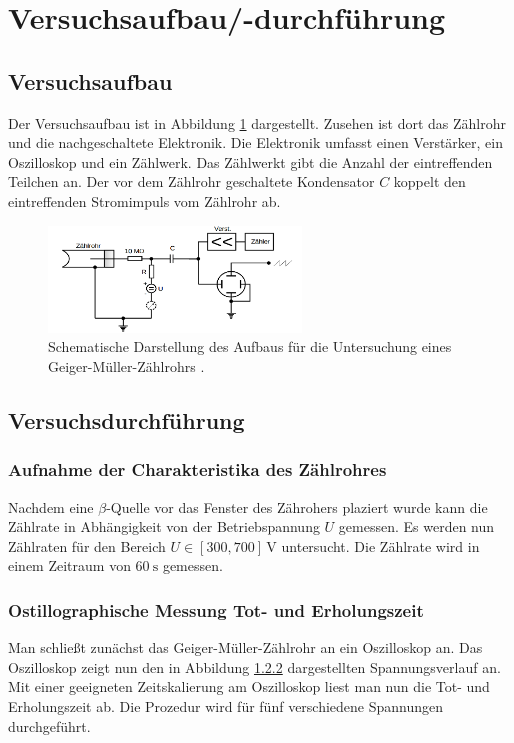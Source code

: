 \section{Versuchsaufbau/-durchführung}

\subsection{Versuchsaufbau}

Der Versuchsaufbau ist in Abbildung \ref{fig: versuchsaufabu} dargestellt.
Zusehen ist dort das Zählrohr und die nachgeschaltete Elektronik.
Die Elektronik umfasst einen Verstärker, ein Oszilloskop und
ein Zählwerk. Das Zählwerkt gibt die Anzahl der eintreffenden Teilchen
an. Der vor dem Zählrohr geschaltete Kondensator $C$ koppelt den eintreffenden
Stromimpuls vom Zählrohr ab.
\begin{figure}
  \centering
  \includegraphics[width=0.6\textwidth]{bilder/aufbau.png}
  \caption{Schematische Darstellung des Aufbaus für die Untersuchung eines Geiger-Müller-Zählrohrs \cite{anleitung703}.}
  \label{fig: versuchsaufabu}
  \end{figure}
\subsection{Versuchsdurchführung}

\subsubsection{Aufnahme der Charakteristika des Zählrohres}

Nachdem eine $\beta$-Quelle vor das Fenster des Zährohers plaziert wurde
kann die Zählrate in Abhängigkeit von der Betriebspannung $U$ gemessen.
Es werden nun Zählraten für den Bereich $U\in\left[300, 700\right] \, \si{\volt}$
untersucht. Die Zählrate wird in einem Zeitraum von $\SI{60}{\second}$ gemessen.


\subsubsection{Ostillographische Messung Tot- und Erholungszeit}
Man schließt zunächst das Geiger-Müller-Zählrohr an ein
Oszilloskop an. Das Oszilloskop zeigt nun den in Abbildung \ref{}
dargestellten Spannungsverlauf an. Mit einer geeigneten Zeitskalierung am Oszilloskop
liest man nun die Tot- und Erholungszeit ab.
Die Prozedur wird für fünf verschiedene Spannungen durchgeführt.

